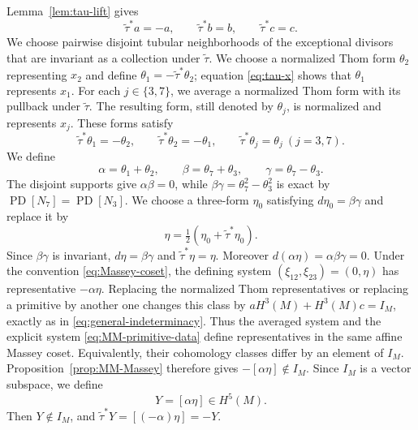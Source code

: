 \documentclass[11pt]{article}
\theoremstyle{remark}\newtheorem{remark}[theorem]{Remark}
\newcommand{\PD}{\operatorname{PD}}
\begin{document}
Lemma~\ref{lem:tau-lift} gives
\begin{equation}\label{eq:parities}
\widetilde\tau^*a=-a,\qquad \widetilde\tau^*b=b,\qquad
\widetilde\tau^*c=c.
\end{equation}
We choose pairwise disjoint tubular neighborhoods of the exceptional
divisors that are invariant as a collection under $\widetilde\tau$.  We
choose a normalized Thom form $\theta_2$ representing $x_2$ and define
$\theta_1=-\widetilde\tau^*\theta_2$; equation \eqref{eq:tau-x} shows that
$\theta_1$ represents $x_1$.  For each $j\in\{3,7\}$, we average a
normalized Thom form with its pullback under $\widetilde\tau$.  The
resulting form, still denoted by $\theta_j$, is normalized and represents
$x_j$.  These forms satisfy
\begin{equation}\label{eq:thom-parities}
\widetilde\tau^*\theta_1=-\theta_2,\qquad
\widetilde\tau^*\theta_2=-\theta_1,\qquad
\widetilde\tau^*\theta_j=\theta_j\ (j=3,7).
\end{equation}
We define
\begin{equation}\label{eq:forms-abc}
\alpha=\theta_1+\theta_2,\qquad \beta=\theta_7+\theta_3,\qquad
\gamma=\theta_7-\theta_3.
\end{equation}
The disjoint supports give $\alpha\beta=0$, while
$\beta\gamma=\theta_7^2-\theta_3^2$ is exact by
$\PD[N_7]=\PD[N_3]$.  We choose a three-form $\eta_0$ satisfying
$d\eta_0=\beta\gamma$ and replace it by
\begin{equation}\label{eq:eta-average}
\eta=\tfrac12(\eta_0+\widetilde\tau^*\eta_0).
\end{equation}
Since $\beta\gamma$ is invariant, $d\eta=\beta\gamma$ and
$\widetilde\tau^*\eta=\eta$.  Moreover
$d(\alpha\eta)=\alpha\beta\gamma=0$.  Under the convention
\eqref{eq:Massey-coset}, the defining system
$(\xi_{12},\xi_{23})=(0,\eta)$ has representative $-\alpha\eta$.
Replacing the normalized Thom representatives or replacing a primitive by
another one changes this class by
$aH^3(M)+H^3(M)c=I_M$, exactly as in
\eqref{eq:general-indeterminacy}.  Thus the averaged system and the
explicit system \eqref{eq:MM-primitive-data} define representatives in the
same affine Massey coset.  Equivalently, their cohomology classes differ by
an element of $I_M$.
Proposition~\ref{prop:MM-Massey} therefore gives
$-[\alpha\eta]\notin I_M$.  Since $I_M$ is a vector subspace, we define
\begin{equation}\label{eq:Y-def}Y=[\alpha\eta]\in H^5(M).\end{equation}
Then $Y\notin I_M$, and
$\widetilde\tau^*Y=[(-\alpha)\eta]=-Y$.
\end{document}
